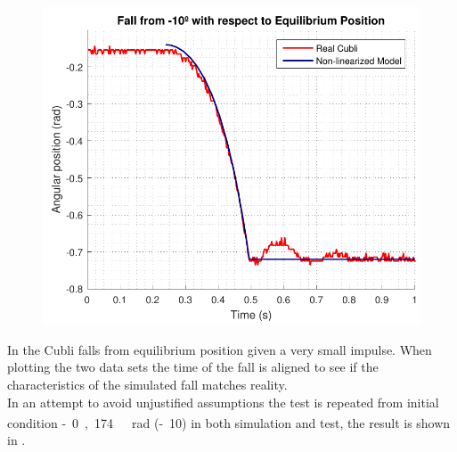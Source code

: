 \begin{minipage}{\linewidth}
\begin{minipage}{0.5\linewidth}
\begin{figure}[H]
			\includegraphics[scale=.48]{figures/FallTestComparison10deg}
			\centering
			\captionsetup{justification=centering}
			\label{FallTestComparison10deg}
		\end{figure}%
	\end{minipage}
\end{minipage}

In  the Cubli falls from equilibrium position given a very small impulse. When plotting the two data sets the time of the fall is aligned to see if the characteristics of the simulated fall matches reality.\\
In an attempt to avoid unjustified assumptions the test is repeated from initial condition \si{-0,174\ rad} (\si{-10^\circ}) in both simulation and test, the result is shown in .

